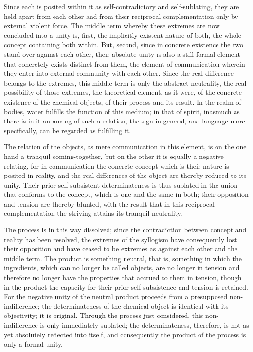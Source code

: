 Since each is posited within it
as self-contradictory and self-sublating,
they are held apart from each other
and from their reciprocal complementation
only by external violent force.
The middle term whereby these extremes are
now concluded into a unity is,
first, the implicitly existent nature of both,
the whole concept containing both within.
But, second, since in concrete existence
the two stand over against each other,
their absolute unity is also a still formal element
that concretely exists distinct from them,
the element of communication wherein they enter
into external community with each other.
Since the real difference belongs to the extremes,
this middle term is only the abstract neutrality,
the real possibility of those extremes,
the theoretical element, as it were,
of the concrete existence of the chemical objects,
of their process and its result.
In the realm of bodies, water fulfills
the function of this medium;
in that of spirit, inasmuch as there is in it
an analog of such a relation,
the sign in general, and language more specifically,
can be regarded as fulfilling it.

The relation of the objects,
as mere communication in this element,
is on the one hand a tranquil coming-together,
but on the other it is equally a negative relating,
for in communication the concrete concept
which is their nature is posited in reality,
and the real differences of the object are
thereby reduced to its unity.
Their prior self-subsistent determinateness
is thus sublated in the union that conforms to the concept,
which is one and the same in both;
their opposition and tension are thereby blunted,
with the result that in this reciprocal complementation
the striving attains its tranquil neutrality.

The process is in this way dissolved;
since the contradiction between
concept and reality has been resolved,
the extremes of the syllogism have
consequently lost their opposition
and have ceased to be extremes as
against each other and the middle term.
The product is something neutral, that is,
something in which the ingredients,
which can no longer be called objects,
are no longer in tension
and therefore no longer have
the properties that accrued to them in tension,
though in the product the capacity for
their prior self-subsistence and tension is retained.
For the negative unity of the neutral product proceeds
from a presupposed non-indifference;
the determinateness of the chemical object is
identical with its objectivity; it is original.
Through the process just considered,
this non-indifference is only immediately sublated;
the determinateness, therefore, is
not as yet absolutely reflected into itself,
and consequently the product of the process is
only a formal unity.

